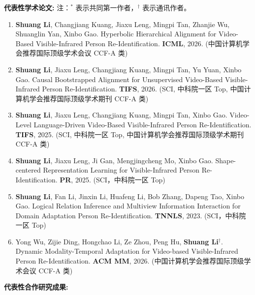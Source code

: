 \documentclass{resume}
\begin{document}
\textbf{代表性学术论文:}
{\small 注：$^*$ 表示共同第一作者，$^\dagger$ 表示通讯作者。}
\begin{enumerate}[itemsep=1.8mm]

\item \textbf{Shuang Li}, Changjiang Kuang, Jiaxu Leng, Mingpi Tan, Zhanjie Wu, Shuanglin Yan, Xinbo Gao. Hyperbolic Hierarchical Alignment for Video-Based Visible-Infrared Person Re-Identification. {\textbf{ICML}}, 2026. (中国计算机学会推荐国际顶级学术会议 CCF-A 类)

\item \textbf{Shuang Li}, Jiaxu Leng, Changjiang Kuang, Mingpi Tan, Yu Yuan, Xinbo Gao. Causal Bootstrapped Alignment for Unsupervised Video-Based Visible-Infrared Person Re-Identification. {\textbf{TIFS}}, 2026. (SCI, 中科院一区 Top, 中国计算机学会推荐国际顶级学术期刊 CCF-A 类)



\item \textbf{Shuang Li}, Jiaxu Leng, Changjiang Kuang, Mingpi Tan, Xinbo Gao. Video-Level Language-Driven Video-Based Visible-Infrared Person Re-Identification. {\textbf{TIFS}}, 2025. (SCI, 中科院一区 Top, 中国计算机学会推荐国际顶级学术期刊 CCF-A 类)

\item \textbf{Shuang Li}, Jiaxu Leng, Ji Gan, Mengjingcheng Mo, Xinbo Gao. Shape-centered Representation Learning for Visible-Infrared Person Re-Identification. {\textbf{PR}}, 2025. (SCI，中科院一区 Top)

\item \textbf{Shuang Li}, Fan Li, Jinxin Li, Huafeng Li, Bob Zhang, Dapeng Tao, Xinbo Gao. Logical Relation Inference and Multiview Information Interaction for Domain Adaptation Person Re-Identification. {\textbf{TNNLS}}, 2023. (SCI，中科院一区 Top)



\item Yong Wu, Zijie Ding, Hongchao Li, Ze Zhou, Peng Hu, \textbf{Shuang Li$^\dagger$}. Dynamic Modality-Temporal Adaptation for Video-based Visible-Infrared Person Re-Identification. {\textbf{ACM MM}}, 2026. (中国计算机学会推荐国际顶级学术会议 CCF-A 类)
\end{enumerate}
\newpage
\textbf{代表性合作研究成果:}
\end{document}

